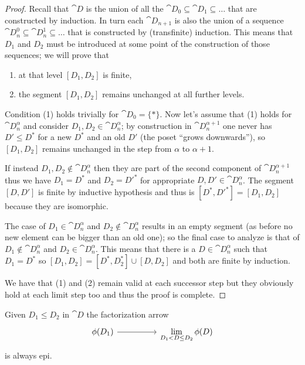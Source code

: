 \begin{proof}
  Recall that \(\cat{D}\) is the union of all the \(\cat{D}_0\subseteq\cat{D}_1\subseteq\ldots\) that are constructed by induction. In turn each \(\cat{D}_{n+1}\) is also the union of a sequence \(\cat{D}_n^0\subseteq\cat{D}_n^1\subseteq\ldots\) that is constructed by (transfinite) induction. This means that \(D_1\) and \(D_2\) must be introduced at some point of the construction of those sequences; we will prove that
  \begin{enumerate}[label=(\arabic*)]
  \item at that level \([D_1, D_2]\) is finite,
  \item the segment \([D_1, D_2]\) remains unchanged at all further levels.
  \end{enumerate}
  Condition (1) holds trivially for \(\cat{D}_0=\{*\}\). Now let's assume that (1) holds for \(\cat{D}_n^\alpha\) and consider \(D_1,D_2\in\cat{D}_n^{\alpha}\); by construction in \(\cat{D}_n^{\alpha+1}\) one never has \(D'\leq D^*\) for a new \(D^*\) and an old \(D'\) (the poset ``grows downwards''), so \([D_1, D_2]\) remains unchanged in the step from \(\alpha\) to \(\alpha + 1\).

  If instead \(D_1, D_2\not\in\cat{D}_n^\alpha\) then they are part of the second component of \(\cat{D}_n^{\alpha+1}\) thus we have \(D_1 = D^*\) and \(D_2 = D'^*\) for appropriate \(D, D'\in\cat{D}_n^\alpha\). The segment \([D, D']\) is finite by inductive hypothesis and thus is \([D^*, D'^*] = [D_1, D_2]\) because they are isomorphic.

  The case of \(D_1\in\cat{D}_n^\alpha\) and \(D_2\not\in\cat{D}_n^\alpha\) results in an empty segment (as before no new element can be bigger than an old one); so the final case to analyze is that of \(D_1\not\in\cat{D}_n^\alpha\) and \(D_2\in\cat{D}_n^\alpha\). This means that there is a \(D\in\cat{D}_n^\alpha\) such that \(D_1 = D^*\) so \([D_1, D_2] = [D^*, D_2^*]\cup[D, D_2]\) and both are finite by induction.

  We have that (1) and (2) remain valid at each successor step but they obviously hold at each limit step too and thus the proof is complete.
\end{proof}

\begin{lemma}
  \label{lemma:limit_factorization_is_epi}
  Given \(D_1\leq D_2\) in \(\cat{D}\) the factorization arrow
  \begin{equation*}
    \begin{tikzcd}[sep=huge]
      \phi(D_1) \ar[r, ""] & \displaystyle\lim_{D_1<D\leq D_2}\phi(D)
    \end{tikzcd}
  \end{equation*}
  is always epi.
\end{lemma}

